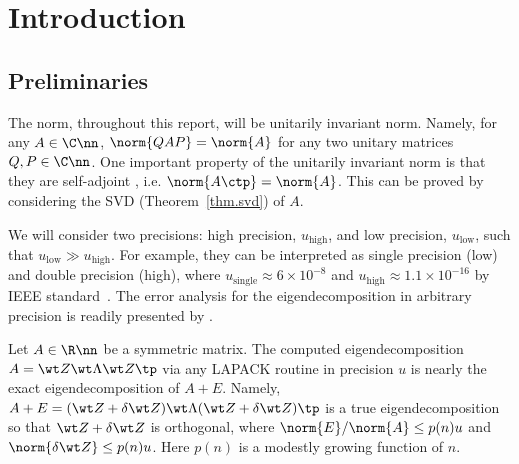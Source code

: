 \documentclass{article}
\numberwithin{equation}{section} %
\begin{document}
\maketitle
\thispagestyle{firstpage}

\section{Introduction}

\subsection{Preliminaries}
The norm, throughout this report, will be unitarily invariant norm.
Namely, for any $A\in\C\nn$, $\norm{QAP} = \norm{A}$ for any two unitary
matrices $Q,P \in \C\nn$.
One important property of the unitarily invariant norm is that
they are self-adjoint , i.e.
$\norm{A\ctp} = \norm{A}$. This can be proved by considering the SVD
(Theorem~\ref{thm.svd}) of $A$. 

We will consider two precisions: high precision,
$u_{\mathrm{high}}$, and low precision, $u_{\mathrm{low}}$, such that
$u_{\mathrm{low}} \gg u_{\mathrm{high}}$.
For example, they can be interpreted as single precision (low) and double
precision (high), where 
$u_{\mathrm{single}} \approx 6 \times 10^{-8}$ and $u_{\mathrm{high}}
\approx 1.1 \times 10^{-16}$ by IEEE standard~.
The error analysis for the eigendecomposition in arbitrary precision is
readily presented by \cite[Sec.~4.7.1]{abbb99_lug}.
\begin{theorem}
\label{thm.lug-eig-error}
Let $A\in\R\nn$ be a symmetric matrix. The computed eigendecomposition $A =
\wt Z \wt \Lambda \wt Z\tp$ via any LAPACK routine in precision $u$ is
nearly the exact eigendecomposition of $A+E$.
Namely, $A + E = (\wt Z + \delta \wt Z)\wt \Lambda (\wt Z + \delta
\wt Z)\tp$ is a true eigendecomposition so that $\wt Z + \delta \wt Z$ is
orthogonal, where $\norm{E}/\norm{A} \le p(n)u$ and $\norm{\delta \wt Z}
\le p(n)u$. Here $p(n)$ is a modestly growing function of $n$.
\end{theorem}
\end{document}
